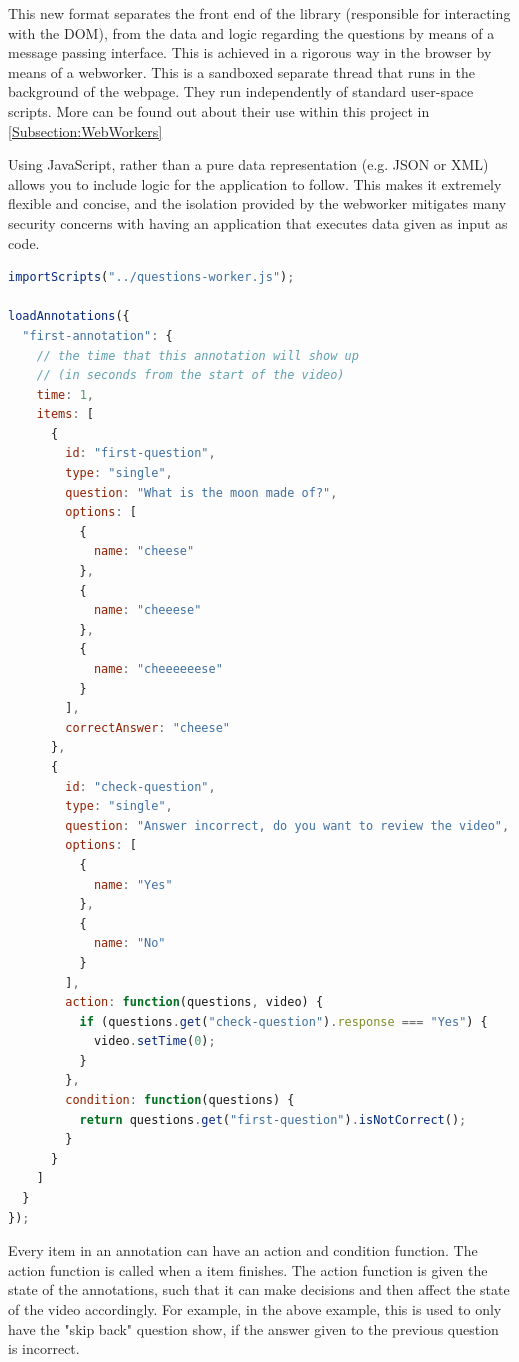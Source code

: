 This new format separates the front end of the library (responsible for
interacting with the \gls{DOM}), from the data and logic regarding the questions by
means of a message passing interface. This is achieved in a rigorous way in the
browser by means of a \gls{webworker}. This is a sandboxed separate thread that runs
in the background of the webpage. They run independently of standard user-space
scripts.  More can be found out about their use within this project in \autoref{Subsection:WebWorkers}

Using JavaScript, rather than a pure data representation (e.g. JSON or XML)
allows you to include logic for the application to follow. This makes it extremely
flexible and concise, and the isolation provided by the \gls{webworker} mitigates
many security concerns with having an application that executes data given as
input as code.

\begin{lstlisting}[language=javascript,caption={Code for loading an annotation},label={code:questionworker} ]
importScripts("../questions-worker.js");

loadAnnotations({
  "first-annotation": {
    // the time that this annotation will show up
    // (in seconds from the start of the video)
    time: 1,
    items: [
      {
        id: "first-question",
        type: "single",
        question: "What is the moon made of?",
        options: [
          {
            name: "cheese"
          },
          {
            name: "cheeese"
          },
          {
            name: "cheeeeeese"
          }
        ],
        correctAnswer: "cheese"
      },
      {
        id: "check-question",
        type: "single",
        question: "Answer incorrect, do you want to review the video",
        options: [
          {
            name: "Yes"
          },
          {
            name: "No"
          }
        ],
        action: function(questions, video) {
          if (questions.get("check-question").response === "Yes") {
            video.setTime(0);
          }
        },
        condition: function(questions) {
          return questions.get("first-question").isNotCorrect();
        }
      }
    ]
  }
});
\end{lstlisting}

Every item in an annotation can have an action and condition function. The
action function is called when a item finishes. The action function is given
the state of the annotations, such that it can make decisions and then affect
the state of the video accordingly. For example, in the above example, this is
used to only have the "skip back" question show, if the answer given to the
previous question is incorrect.

